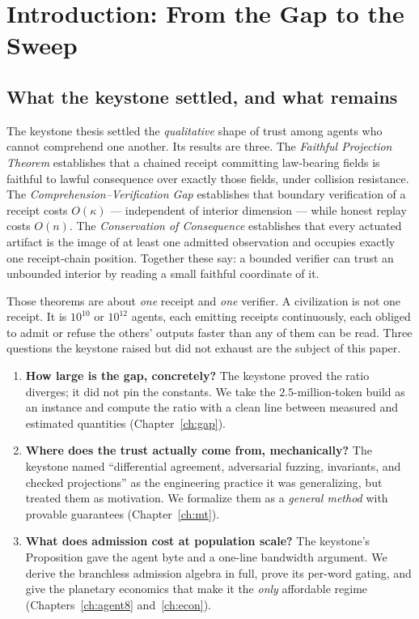 \documentclass[11pt,oneside]{book}
\theoremstyle{definition}
\theoremstyle{plain}
\theoremstyle{remark}
\newcommand{\CL}{\kappa}                       %
\begin{document}
\tableofcontents

\mainmatter

\chapter{Introduction: From the Gap to the Sweep}
\label{ch:intro}

\section{What the keystone settled, and what remains}
The keystone thesis \cite{chatman2025} settled the \emph{qualitative} shape of trust among agents who cannot comprehend one another. %
Its results are three. %
The \emph{Faithful Projection Theorem} \cite{chatman2025} establishes that a chained receipt committing law-bearing fields is faithful to lawful consequence over exactly those fields, under collision resistance. %
The \emph{Comprehension--Verification Gap} \cite{chatman2025} establishes that boundary verification of a receipt costs $O(\CL)$ --- independent of interior dimension --- while honest replay costs $O(n)$. %
The \emph{Conservation of Consequence} \cite{chatman2025} establishes that every actuated artifact is the image of at least one admitted observation and occupies exactly one receipt-chain position. %
Together these say: a bounded verifier can trust an unbounded interior by reading a small faithful coordinate of it. %

Those theorems are about \emph{one} receipt and \emph{one} verifier. %
A civilization is not one receipt. %
It is $10^{10}$ or $10^{12}$ agents, each emitting receipts continuously, each obliged to admit or refuse the others' outputs faster than any of them can be read. %
Three questions the keystone raised but did not exhaust are the subject of this paper. %

\begin{enumerate}[label=(Q\arabic*),leftmargin=*]
\item \textbf{How large is the gap, concretely?} The keystone proved the ratio diverges; it did not pin the constants. We take the $2.5$-million-token build as an instance and compute the ratio with a clean line between measured and estimated quantities (Chapter~\ref{ch:gap}). %
\item \textbf{Where does the trust actually come from, mechanically?} The keystone named ``differential agreement, adversarial fuzzing, invariants, and checked projections'' as the engineering practice it was generalizing, but treated them as motivation. We formalize them as a \emph{general method} with provable guarantees (Chapter~\ref{ch:mt}). %
\item \textbf{What does admission cost at population scale?} The keystone's Proposition gave the agent byte and a one-line bandwidth argument. We derive the branchless admission algebra in full, prove its per-word gating, and give the planetary economics that make it the \emph{only} affordable regime (Chapters~\ref{ch:agent8} and~\ref{ch:econ}). %
\end{enumerate}
\end{document}
